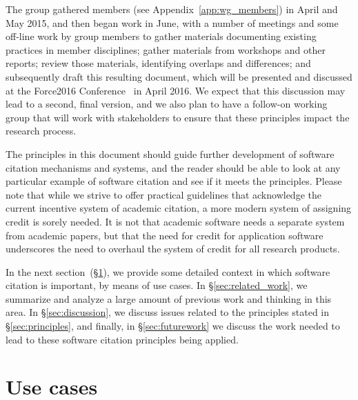 \documentclass[11pt, oneside]{amsart}
\begin{document}
The group gathered members (see Appendix~\ref{app:wg_members}) in April and May 2015,
and then began work in June, with a number of meetings
and some off-line work by group members to gather materials documenting existing
practices in member disciplines; gather materials from workshops and other reports;
review those materials, identifying overlaps and differences; and subsequently draft this resulting document,
which will be presented and discussed at the Force2016 Conference~\cite{force2016}
in April 2016.  We expect that this discussion may lead to a second, final version, and we also
plan to have a follow-on working group that will work with stakeholders to ensure that
these principles impact the research process.

The principles in this document should guide further development of software citation
mechanisms and systems, and the reader should be able to look at any particular example
of software citation and see if it meets the principles.
Please note that while we strive to offer practical guidelines that acknowledge the current incentive system of academic citation, a more modern system of assigning credit is sorely needed.
It is not that academic software needs a separate system from academic papers, but that the need for credit for application software underscores the need to overhaul the system of credit for all research products.

In the next section~(\S\ref{sec:use_cases}), we provide some detailed context in
which software citation is important, by means of use cases. In
\S\ref{sec:related_work}, we summarize and analyze a large amount of previous
work and thinking in this area. In \S\ref{sec:discussion}, we discuss issues
related to the principles stated in \S\ref{sec:principles}, and finally, in
\S\ref{sec:futurework} we discuss the work needed to lead to these
software citation principles being applied.

\section{Use cases}
\label{sec:use_cases}
\end{document}

